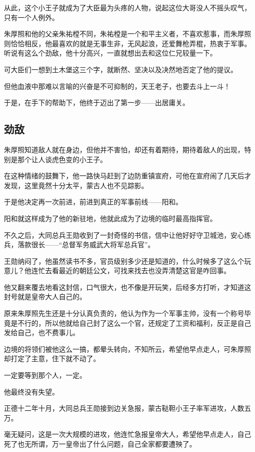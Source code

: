 \begin{multicols}{\theparacolNo}
从此，这个小王子就成为了大臣最为头疼的人物，说起这位大哥没人不摇头叹气，只有一个人例外。

朱厚照和他的父亲朱祐樘不同，朱祐樘是一个和平主义者，不喜欢惹事，而朱厚照则恰恰相反，他最喜欢的就是无事生非，无风起浪，还爱舞枪弄棍，热衷于军事。听说有这么个劲敌，他十分高兴，一直就想出去和这位仁兄较量一下。

可大臣们一想到土木堡这三个字，就断然、坚决以及决然地否定了他的提议。

但他血液中那难以言喻的兴奋是不可抑制的，天王老子，也要去斗上一斗！

于是，在手下的帮助下，他终于迈出了第一步——出居庸关。

\subsection{劲敌}
朱厚照知道敌人就在身边，但他并不害怕，却还有着期待，期待着敌人的出现，特别是那个让人谈虎色变的小王子。

在这种情绪的鼓舞下，他一路快马赶到了边防重镇宣府，可他在宣府闹了几天后才发现，这里竟然十分太平，蒙古人也不见踪影。

于是他决定再一次前进，前进到真正的军事前线——阳和。

阳和就这样成为了他的新驻地，他就此成为了边境的临时最高指挥官。

不久之后，大同总兵王勋收到了一封奇怪的书信，信中让他好好守卫城池，安心练兵，落款很长——“总督军务威武大将军总兵官”。

王勋纳闷了，他虽然读书不多，官员级别多少还是知道的，什么时候多了这么个玩意儿？他连忙去看最近的朝廷公文，可找来找去也没弄清楚这官是咋回事。

他又翻来覆去地看这封信，口气很大，也不像是开玩笑，后经多方打听，才知道这封号就是皇帝大人自己的。

原来朱厚照先生还是十分认真负责的，他认为作为一个军事主帅，没有一个称号毕竟是不行的，所以他就给自己封了这么一个官，还规定了工资和福利，反正是自己发给自己，也不费事儿。

边境的将领们被他这么一搞，都晕头转向，不知所云，希望他早点走人，可朱厚照却打定了主意，住下就不动了。

一定要等到那个人，一定。

他最终没有失望。

正德十二年十月，大同总兵王勋接到边关急报，蒙古鞑靼小王子率军进攻，人数五万。

毫无疑问，这是一次大规模的进攻，他连忙急报皇帝大人，希望他早点走人，自己死了也无所谓，万一皇帝出了什么问题，自己全家都要遭殃了。


\end{multicols}
